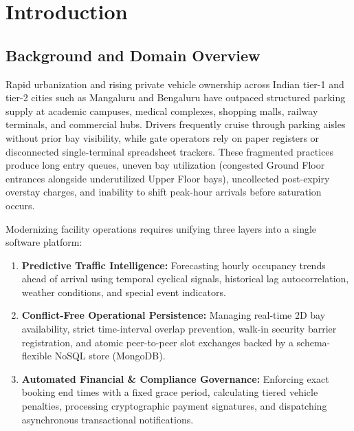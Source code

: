 \documentclass[12pt,a4paper,oneside]{report}
\begin{document}

\chapter{Introduction}

\section{Background and Domain Overview}
Rapid urbanization and rising private vehicle ownership across Indian tier-1 and tier-2 cities such as Mangaluru and Bengaluru have outpaced structured parking supply at academic campuses, medical complexes, shopping malls, railway terminals, and commercial hubs. Drivers frequently cruise through parking aisles without prior bay visibility, while gate operators rely on paper registers or disconnected single-terminal spreadsheet trackers. These fragmented practices produce long entry queues, uneven bay utilization (congested Ground Floor entrances alongside underutilized Upper Floor bays), uncollected post-expiry overstay charges, and inability to shift peak-hour arrivals before saturation occurs.

Modernizing facility operations requires unifying three layers into a single software platform:
\begin{enumerate}[leftmargin=*]
  \item \textbf{Predictive Traffic Intelligence:} Forecasting hourly occupancy trends ahead of arrival using temporal cyclical signals, historical lag autocorrelation, weather conditions, and special event indicators.
  \item \textbf{Conflict-Free Operational Persistence:} Managing real-time 2D bay availability, strict time-interval overlap prevention, walk-in security barrier registration, and atomic peer-to-peer slot exchanges backed by a schema-flexible NoSQL store (MongoDB).
  \item \textbf{Automated Financial \& Compliance Governance:} Enforcing exact booking end times with a fixed grace period, calculating tiered vehicle penalties, processing cryptographic payment signatures, and dispatching asynchronous transactional notifications.
\end{enumerate}
\end{document}
